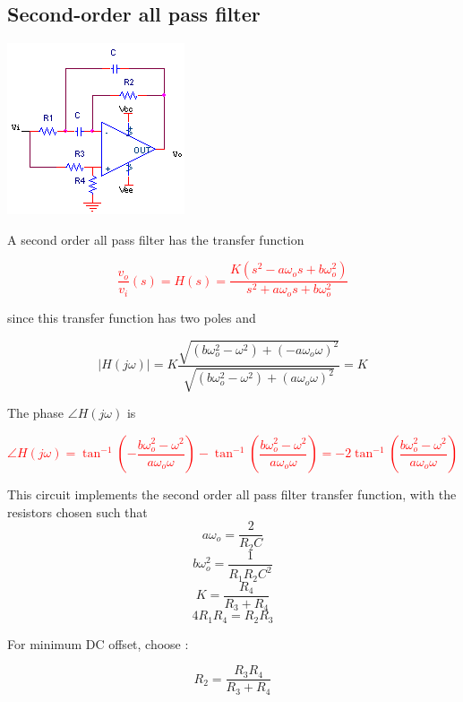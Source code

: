 \subsection{Second-order all pass filter}
\begin{center}
	\includegraphics{schematics/2ndorder_allpass.PNG}
\end{center}
A second order all pass filter has the transfer function

\textcolor{red}{
\begin{equation}
\frac{v_{o}}{v_{i}}(s) = H(s) = \frac{K(s^{2} - a\omega_{o}s + b\omega_{o}^{2})}{s^{2} + a\omega_{o}s + b\omega_{o}^{2}}
\label{eq:2ndorder_allpass}
\end{equation}
}

since this transfer function has two poles and

\begin{equation}
|H(j\omega)| = K\frac{\sqrt{(b\omega_{o}^{2}-\omega^{2}) + (-a\omega_{o}\omega)^{2}}}{\sqrt{(b\omega_{o}^{2}-\omega^{2}) + (a\omega_{o}\omega)^{2}}} = K
\end{equation}

The phase $\angle H(j\omega)$ is

\textcolor{red}{
\begin{equation}
\angle H(j\omega) = \tan^{-1}\left(-\frac{b\omega_{o}^{2}-\omega^{2}}{a\omega_{o}\omega}\right) - \tan^{-1}\left(\frac{b\omega_{o}^{2}-\omega^{2}}{a\omega_{o}\omega}\right) = -2\tan^{-1}\left(\frac{b\omega_{o}^{2}-\omega^{2}}{a\omega_{o}\omega}\right)
\label{eq:2ndorder_allpass_angle}
\end{equation}
}

This circuit implements the second order all pass filter transfer function, with the resistors chosen such that
\begin{equation}
a\omega_{o} = \frac{2}{R_2 C}
\end{equation}
\begin{equation}
b\omega_{o}^2 = \frac{1}{R_1 R_2 C^2}
\end{equation}
\begin{equation}
K = \frac{R_4}{R_3 + R_4}
\end{equation}
\begin{equation}
4R_1 R_4 = R_2 R_3
\end{equation}

For minimum DC offset, choose \autocite[151-153]{op-amp-circuits-johnson}:

\begin{equation}
R_2 = \frac{R_3 R_4}{R_3 + R_4}
\end{equation}